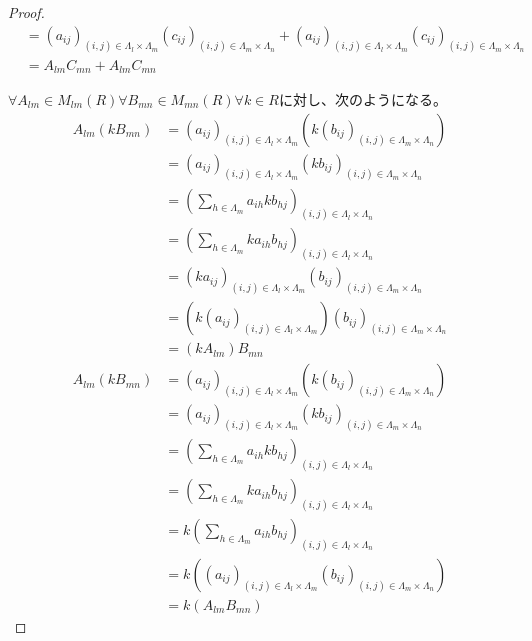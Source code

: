 \documentclass[dvipdfmx]{jsarticle}
\begin{document}
\begin{proof}
\begin{align*}
&= \left( a_{ij} \right)_{(i,j) \in \varLambda_{l} \times \varLambda_{m}}\left( c_{ij} \right)_{(i,j) \in \varLambda_{m} \times \varLambda_{n}} + \left( a_{ij} \right)_{(i,j) \in \varLambda_{l} \times \varLambda_{m}}\left( c_{ij} \right)_{(i,j) \in \varLambda_{m} \times \varLambda_{n}}\\
&= A_{lm}C_{mn} + A_{lm}C_{mn}
\end{align*}\par
$\forall A_{lm} \in M_{lm}(R)\forall B_{mn} \in M_{mn}(R)\forall k \in R$に対し、次のようになる。
\begin{align*}
A_{lm}\left( kB_{mn} \right) &= \left( a_{ij} \right)_{(i,j) \in \varLambda_{l} \times \varLambda_{m}}\left( k\left( b_{ij} \right)_{(i,j) \in \varLambda_{m} \times \varLambda_{n}} \right)\\
&= \left( a_{ij} \right)_{(i,j) \in \varLambda_{l} \times \varLambda_{m}}\left( kb_{ij} \right)_{(i,j) \in \varLambda_{m} \times \varLambda_{n}}\\
&= \left( \sum_{h \in \varLambda_{m}} {a_{ih}kb_{hj}} \right)_{(i,j) \in \varLambda_{l} \times \varLambda_{n}}\\
&= \left( \sum_{h \in \varLambda_{m}} {ka_{ih}b_{hj}} \right)_{(i,j) \in \varLambda_{l} \times \varLambda_{n}}\\
&= \left( ka_{ij} \right)_{(i,j) \in \varLambda_{l} \times \varLambda_{m}}\left( b_{ij} \right)_{(i,j) \in \varLambda_{m} \times \varLambda_{n}}\\
&= \left( k\left( a_{ij} \right)_{(i,j) \in \varLambda_{l} \times \varLambda_{m}} \right)\left( b_{ij} \right)_{(i,j) \in \varLambda_{m} \times \varLambda_{n}} \\
&= \left( kA_{lm} \right)B_{mn}\\
A_{lm}\left( kB_{mn} \right) &= \left( a_{ij} \right)_{(i,j) \in \varLambda_{l} \times \varLambda_{m}}\left( k\left( b_{ij} \right)_{(i,j) \in \varLambda_{m} \times \varLambda_{n}} \right)\\
&= \left( a_{ij} \right)_{(i,j) \in \varLambda_{l} \times \varLambda_{m}}\left( kb_{ij} \right)_{(i,j) \in \varLambda_{m} \times \varLambda_{n}}\\
&= \left( \sum_{h \in \varLambda_{m}} {a_{ih}kb_{hj}} \right)_{(i,j) \in \varLambda_{l} \times \varLambda_{n}}\\
&= \left( \sum_{h \in \varLambda_{m}} {ka_{ih}b_{hj}} \right)_{(i,j) \in \varLambda_{l} \times \varLambda_{n}}\\
&= k\left( \sum_{h \in \varLambda_{m}} {a_{ih}b_{hj}} \right)_{(i,j) \in \varLambda_{l} \times \varLambda_{n}}\\
&= k\left( \left( a_{ij} \right)_{(i,j) \in \varLambda_{l} \times \varLambda_{m}}\left( b_{ij} \right)_{(i,j) \in \varLambda_{m} \times \varLambda_{n}} \right) \\
&= k\left( A_{lm}B_{mn} \right)
\end{align*}
\end{proof}
\end{document}

